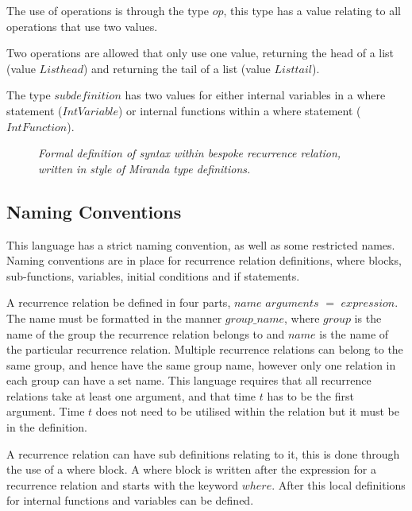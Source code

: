 \documentclass{article}
\begin{document}
The use of operations is through the type $op$, this type has a value relating to all operations that use two values.

Two operations are allowed that only use one value, returning the head of a list (value $Listhead$) and returning the tail of a list (value $Listtail$). 

The type $subdefinition$ has two values for either internal variables in a where statement ($IntVariable$) or internal functions within a where statement ($IntFunction$).  

\begin{figure}[H]
	\centering
	
	\caption{\it Formal definition of syntax within bespoke recurrence relation, written in style of Miranda type definitions.}
	\label{fig:parsetreecode}
\end{figure} 







\subsection{Naming Conventions}
This language has a strict naming convention, as well as some restricted names. Naming conventions are in place for recurrence relation definitions, where blocks, sub-functions, variables, initial conditions and  if statements. 

A recurrence relation be defined in four parts, $name$ $arguments$ $=$ $expression$. The name must be formatted in the manner $group\_name$, where $group$ is the name of the group the recurrence relation belongs to and $name$ is the name of the particular recurrence relation. Multiple recurrence relations can belong to the same group, and hence have the same group name, however only one relation in each group can have a set name. This language requires that all recurrence relations take at least one argument, and that time $t$ has to be the first argument. Time $t$ does not need to be utilised within the relation but it must be in the definition.     

A recurrence relation can have sub definitions relating to it, this is done through the use of a where block. A where block is written after the expression for a recurrence relation and starts with the keyword $where$. After this local definitions for internal functions and variables can be defined. 
\end{document}
